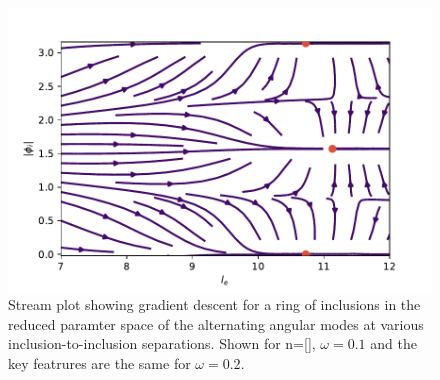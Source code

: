 \begin{figure}[h!]
\centering
\includegraphics[width=12cm]{figures/3-elastic-figs/streams.pdf}
\caption{Stream plot showing gradient descent for a ring of inclusions in the reduced paramter space of the alternating angular modes at various inclusion-to-inclusion separations. Shown for n=[], $\omega=0.1$ and the key featrures are the same for $\omega=0.2$.}
\label{fig:ring_stream}
\end{figure}

